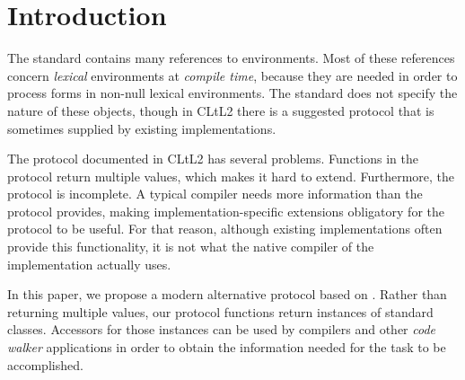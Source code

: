 \section{Introduction}

The \commonlisp{} standard contains many references to environments.
Most of these references concern \emph{lexical} environments at
\emph{compile time}, because they are needed in order to process forms
in non-null lexical environments.  The standard does not specify the
nature of these objects, though in CLtL2 \cite{Steele:1990:CLL:95411}
there is a suggested protocol that is sometimes supplied by existing
\commonlisp{} implementations. 

The protocol documented in CLtL2 has several problems.  Functions in
the protocol return multiple values, which makes it hard to extend.
Furthermore, the protocol is incomplete.  A typical compiler needs
more information than the protocol provides, making
implementation-specific extensions obligatory for the protocol to be
useful.  For that reason, although existing \commonlisp{}
implementations often provide this functionality, it is not what the
native compiler of the implementation actually uses.

In this paper, we propose a modern alternative protocol based on
\clos{}.  Rather than returning multiple values, our protocol
functions return instances of standard classes.  Accessors for those
instances can be used by compilers and other \emph{code walker}
applications in order to obtain the information needed for the task to
be accomplished.


